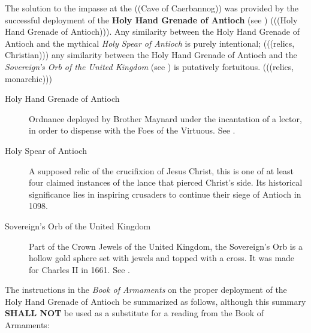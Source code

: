 \documentclass{metanorma}
\begin{document}

The solution to the impasse at the ((Cave of Caerbannog)) was
provided by the successful deployment of the
\textbf{Holy Hand Grenade of Antioch} (see )
(((Holy Hand Grenade of Antioch))).
Any similarity between the Holy Hand Grenade of Antioch and the
mythical \textit{Holy Spear of Antioch} is purely intentional;
(((relics, Christian))) any similarity between the Holy Hand Grenade
of Antioch and the \textit{Sovereign's Orb of the United Kingdom}
(see ) is putatively fortuitous.
(((relics, monarchic)))



\begin{description}
  \item[Holy Hand Grenade of Antioch]
    Ordnance deployed by Brother Maynard under the incantation of a
    lector, in order to dispense with the Foes of the Virtuous.
    See .
  \item[Holy Spear of Antioch]
    A supposed relic of the crucifixion of Jesus Christ, this is one
    of at least four claimed instances of the lance that pierced
    Christ's side. Its historical significance lies in inspiring
    crusaders to continue their siege of Antioch in 1098.
  \item[Sovereign's Orb of the United Kingdom]
    Part of the Crown Jewels of the United Kingdom, the Sovereign's
    Orb is a hollow gold sphere set with jewels and topped with a
    cross.  It was made for Charles II in 1661. 
    See .
\end{description}



The instructions in the \textit{Book of Armaments} on the proper deployment
of the Holy Hand Grenade of Antioch  be summarized as
follows, although this summary \textbf{SHALL NOT} be used as a substitute
for a reading from the Book of Armaments:



\end{document}
